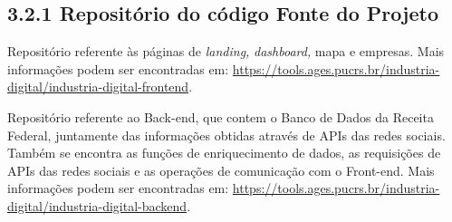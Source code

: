 \hypertarget{__RefHeading___Toc4773_3118176633}{}
\subsection*{3.2.1 Repositório do código Fonte do Projeto}
\label{ages-ii:text-h-0042}

\indent Repositório referente às páginas de \textit{landing, }\textit{dashboard,} mapa e empresas.\originalspace{}
Mais informações podem ser encontradas em: \url{https://tools.ages.pucrs.br/industria-digital/industria-digital-frontend}.\par

\indent Repositório referente ao Back-end, que contem o Banco de Dados da Receita Federal, juntamente das informações obtidas através de APIs das redes sociais. Também se encontra as funções de enriquecimento de dados, as requisições de APIs das redes sociais e as operações de comunicação com o Front-end.\originalspace{}
Mais informações podem ser encontradas em: \url{https://tools.ages.pucrs.br/industria-digital/industria-digital-backend}.\par
